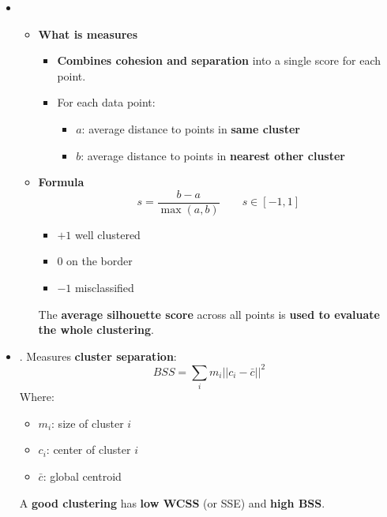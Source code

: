 \begin{itemize}
    \item {}
    \begin{itemize}
        \item[\textcolor{Green3}{\faIcon{question-circle}}] \textcolor{Green3}{\textbf{What is measures}}
        \begin{itemize}
            \item \textbf{Combines cohesion and separation} into a single score for each point.
            \item For each data point:
            \begin{itemize}
                \item $a$: average distance to points in \textbf{same cluster}
                \item $b$: average distance to points in \textbf{nearest other cluster}
            \end{itemize}
        \end{itemize}
        \item[\textcolor{Red2}{\faIcon{book}}] \textcolor{Red2}{\textbf{Formula}}
        \begin{equation}
            s = \dfrac{b - a}{\max\left(a,b\right)} \hspace{2em} s \in \left[-1, 1\right]
        \end{equation}
        \begin{itemize}
            \item[\textcolor{Green3}{\faIcon{check}}] $+1$ well clustered
            \item $0$ on the border
            \item[\textcolor{Red2}{\faIcon{times}}] $-1$ misclassified
        \end{itemize}
        The \textbf{average silhouette score} across all points is \textbf{used to evaluate the whole clustering}.
    \end{itemize}


    \item {}. Measures \textbf{cluster separation}:
    \begin{equation}
        BSS = \displaystyle\sum_{i} m_{i} \left|\left|c_{i} - \bar{c}\right|\right|^{2}
    \end{equation}
    Where:
    \begin{itemize}
        \item $m_{i}$: size of cluster $i$
        \item $c_{i}$: center of cluster $i$
        \item $\bar{c}$: global centroid
    \end{itemize}
    A \textbf{good clustering} has \textbf{low WCSS} (or SSE) and \textbf{high BSS}.
\end{itemize}

